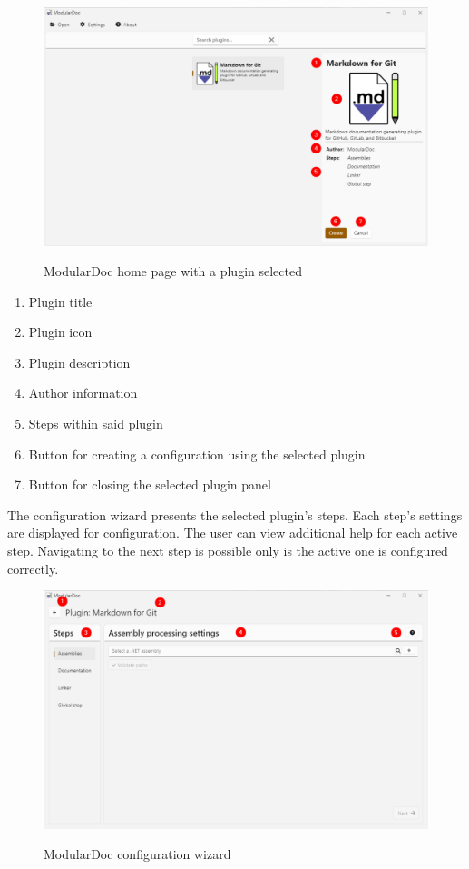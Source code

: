 \begin{figure}[H]
    \includegraphics[width=\linewidth]{img/modularDocPluginSelected.png}
    \label{fig:modularDocPluginSelected}
    \caption{ModularDoc home page with a plugin selected}
\end{figure}

\begin{enumerate}
    \item Plugin title
    \item Plugin icon
    \item Plugin description
    \item Author information
    \item Steps within said plugin
    \item Button for creating a configuration using the selected plugin
    \item Button for closing the selected plugin panel
\end{enumerate}

\pagebreak
The configuration wizard presents the selected plugin's steps. Each step's settings are displayed for configuration. The user can view additional help for each active step. Navigating to the next step is possible only is the active one is configured correctly.

\begin{figure}[H]
    \includegraphics[width=\linewidth]{img/modularDocConfigurator.png}
    \label{fig:modularDocconfiguratorPage}
    \caption{ModularDoc configuration wizard}
\end{figure}

